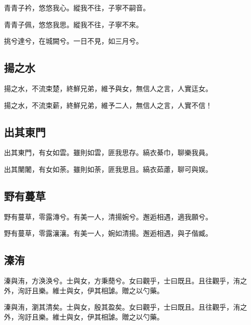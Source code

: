 青青子衿，悠悠我心。縱我不往，子寧不嗣音。

青青子佩，悠悠我思。縱我不往，子寧不來。

挑兮達兮，在城闕兮。一日不見，如三月兮。

\subsection[揚之水]{揚之水}

揚之水，不流束楚，終鮮兄弟，維予與女，無信人之言，人實迋女。

揚之水，不流束薪，終鮮兄弟，維予二人，無信人之言，人實不信！

\subsection[出其東門]{出其東門}

出其東門，有女如雲。雖則如雲，匪我思存。縞衣綦巾，聊樂我員。

出其闉闍，有女如荼。雖則如荼，匪我思且。縞衣茹藘，聊可與娱。

\subsection[野有蔓草]{野有蔓草}

野有蔓草，零露漙兮。有美一人，清揚婉兮。邂逅相遇，適我願兮。

野有蔓草，零露瀼瀼。有美一人，婉如清揚。邂逅相遇，與子偕臧。

\subsection[溱洧]{溱洧}

溱與洧，方涣涣兮。士與女，方秉蕑兮。女曰觀乎，士曰既且。且往觀乎，洧之外，洵訏且樂。維士與女，伊其相謔。贈之以勺藥。

溱與洧，瀏其清矣。士與女，殷其盈矣。女曰觀乎，士曰既且。且往觀乎，洧之外，洵訏且樂。維士與女，伊其相謔。贈之以勺藥。
